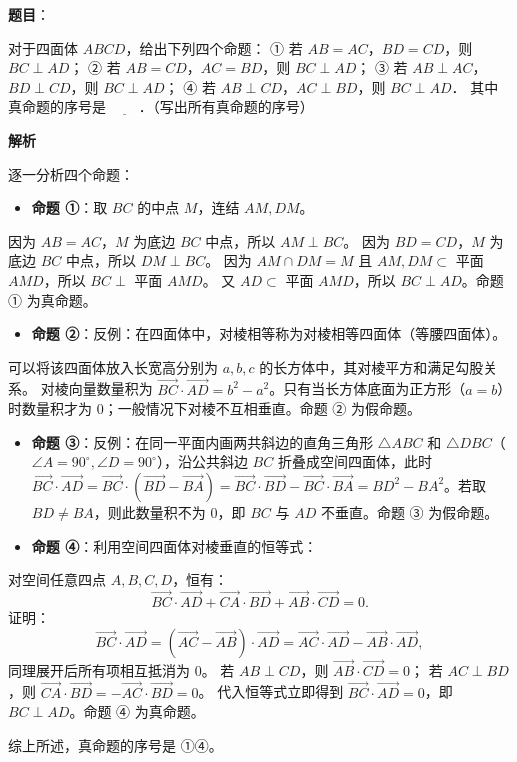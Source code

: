 \begin{answer}

\textbf{题目}：

对于四面体 $ABCD$，给出下列四个命题：
① 若 $AB = AC$，$BD = CD$，则 $BC \perp AD$；
② 若 $AB = CD$，$AC = BD$，则 $BC \perp AD$；
③ 若 $AB \perp AC$，$BD \perp CD$，则 $BC \perp AD$；
④ 若 $AB \perp CD$，$AC \perp BD$，则 $BC \perp AD$．
其中真命题的序号是 $\underline{\hspace{2em}}$．（写出所有真命题的序号）

\textbf{解析}

逐一分析四个命题：
\begin{itemize}
\item \textbf{命题 ①}：取 $BC$ 的中点 $M$，连结 $AM, DM$。
\end{itemize}
  因为 $AB = AC$，$M$ 为底边 $BC$ 中点，所以 $AM \perp BC$。
  因为 $BD = CD$，$M$ 为底边 $BC$ 中点，所以 $DM \perp BC$。
  因为 $AM \cap DM = M$ 且 $AM, DM \subset$ 平面 $AMD$，所以 $BC \perp$ 平面 $AMD$。
  又 $AD \subset$ 平面 $AMD$，所以 $BC \perp AD$。命题 ① 为真命题。
\begin{itemize}
\item \textbf{命题 ②}：反例：在四面体中，对棱相等称为对棱相等四面体（等腰四面体）。
\end{itemize}
  可以将该四面体放入长宽高分别为 $a, b, c$ 的长方体中，其对棱平方和满足勾股关系。
  对棱向量数量积为 $\vec{BC} \cdot \vec{AD} = b^2 - a^2$。只有当长方体底面为正方形（$a = b$）时数量积才为 0；一般情况下对棱不互相垂直。命题 ② 为假命题。
\begin{itemize}
\item \textbf{命题 ③}：反例：在同一平面内画两共斜边的直角三角形 $\triangle ABC$ 和 $\triangle DBC$（$\angle A = 90^\circ, \angle D = 90^\circ$），沿公共斜边 $BC$ 折叠成空间四面体，此时 $\vec{BC} \cdot \vec{AD} = \vec{BC} \cdot (\vec{BD} - \vec{BA}) = \vec{BC} \cdot \vec{BD} - \vec{BC} \cdot \vec{BA} = BD^2 - BA^2$。若取 $BD \ne BA$，则此数量积不为 0，即 $BC$ 与 $AD$ 不垂直。命题 ③ 为假命题。
\item \textbf{命题 ④}：利用空间四面体对棱垂直的恒等式：
\end{itemize}
  对空间任意四点 $A, B, C, D$，恒有：
\nopagebreak[4]
\[\vec{BC} \cdot \vec{AD} + \vec{CA} \cdot \vec{BD} + \vec{AB} \cdot \vec{CD} = 0.\]
  证明：
\nopagebreak[4]
\[\vec{BC} \cdot \vec{AD} = (\vec{AC} - \vec{AB}) \cdot \vec{AD} = \vec{AC} \cdot \vec{AD} - \vec{AB} \cdot \vec{AD},\]
  同理展开后所有项相互抵消为 0。
  若 $AB \perp CD$，则 $\vec{AB} \cdot \vec{CD} = 0$；
  若 $AC \perp BD$，则 $\vec{CA} \cdot \vec{BD} = -\vec{AC} \cdot \vec{BD} = 0$。
  代入恒等式立即得到 $\vec{BC} \cdot \vec{AD} = 0$，即 $BC \perp AD$。命题 ④ 为真命题。

综上所述，真命题的序号是 ①④。


\end{answer}
